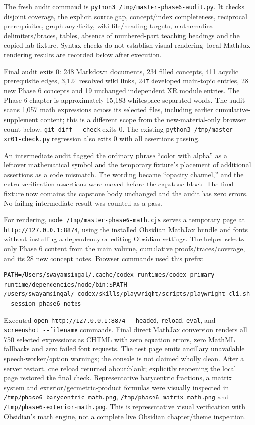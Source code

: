 The fresh audit command is \texttt{python3\ /tmp/master-phase6-audit.py}. It checks disjoint coverage, the explicit source gap, concept/index completeness, reciprocal prerequisites, graph acyclicity, wiki file/heading targets, mathematical delimiters/braces, tables, absence of numbered-part teaching headings and the copied lab fixture. Syntax checks do not establish visual rendering; local MathJax rendering results are recorded below after execution.

Final audit exits 0: 248 Markdown documents, 234 filled concepts, 411 acyclic prerequisite edges, 3,124 resolved wiki links, 247 developed main-topic entries, 28 new Phase 6 concepts and 19 unchanged independent XR module entries. The Phase 6 chapter is approximately 15,183 whitespace-separated words. The audit scans 1,057 math expressions across its selected files, including earlier cumulative-supplement content; this is a different scope from the new-material-only browser count below. \texttt{git\ diff\ -\/-check} exits 0. The existing \texttt{python3\ /tmp/master-xr01-check.py} regression also exits 0 with all assertions passing.

An intermediate audit flagged the ordinary phrase ``color with alpha'' as a leftover mathematical symbol and the temporary fixture's placement of additional assertions as a code mismatch. The wording became ``opacity channel,'' and the extra verification assertions were moved before the capstone block. The final fixture now contains the capstone body unchanged and the audit has zero errors. No failing intermediate result was counted as a pass.

For rendering, \texttt{node\ /tmp/master-phase6-math.cjs} serves a temporary page at \texttt{http://127.0.0.1:8874}, using the installed Obsidian MathJax bundle and fonts without installing a dependency or editing Obsidian settings. The helper selects only Phase 6 content from the main volume, cumulative proofs/traces/coverage, and its 28 new concept notes. Browser commands used this prefix:

\begin{verbatim}
PATH=/Users/swayamsingal/.cache/codex-runtimes/codex-primary-runtime/dependencies/node/bin:$PATH /Users/swayamsingal/.codex/skills/playwright/scripts/playwright_cli.sh --session phase6-notes
\end{verbatim}

Executed \texttt{open\ http://127.0.0.1:8874\ -\/-headed}, \texttt{reload}, \texttt{eval}, and \texttt{screenshot\ -\/-filename} commands. Final direct MathJax conversion renders all 750 selected expressions as CHTML with zero equation errors, zero MathML fallbacks and zero failed font requests. The test page emits ancillary unavailable speech-worker/option warnings; the console is not claimed wholly clean. After a server restart, one reload returned about:blank; explicitly reopening the local page restored the final check. Representative barycentric fractions, a matrix system and exterior/geometric-product formulas were visually inspected in \texttt{/tmp/phase6-barycentric-math.png}, \texttt{/tmp/phase6-matrix-math.png} and \texttt{/tmp/phase6-exterior-math.png}. This is representative visual verification with Obsidian's math engine, not a complete live Obsidian chapter/theme inspection.

